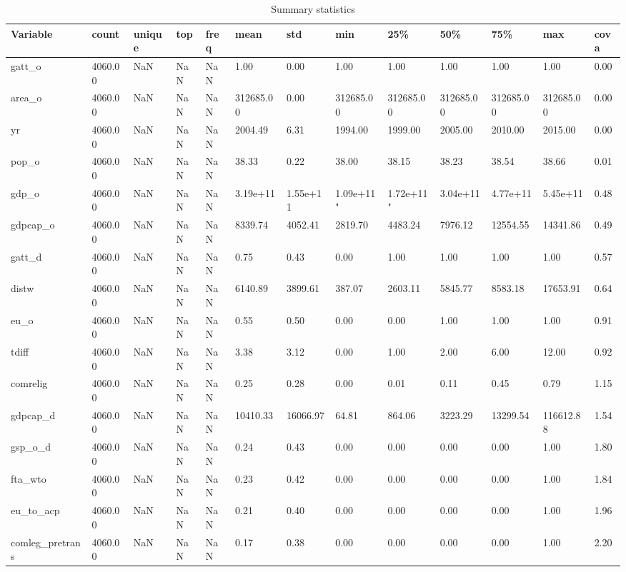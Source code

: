 \documentclass{Trade_template}
\numberwithin{equation}{section}
\begin{document}
\begin{table}
    \centering
    \caption[Summary statistics]{Summary statistics}
    \label{Stats}
\tiny{
\begin{tabularx}{\textwidth}{@{} L *{12}{Y}  @{}}
\toprule
Variable & count & unique & top & freq & mean & std & min & 25\% & 50\% & 75\% & max & cova  \\ \midrule
gatt\_o & 4060.00 & NaN & NaN & NaN & 1.00 & 0.00 & 1.00 & 1.00 & 1.00 & 1.00 & 1.00 & 0.00 \\
area\_o & 4060.00 & NaN & NaN & NaN & 312685.00 & 0.00 & 312685.00 & 312685.00 & 312685.00 & 312685.00 & 312685.00 & 0.00 \\
yr & 4060.00 & NaN & NaN & NaN & 2004.49 & 6.31 & 1994.00 & 1999.00 & 2005.00 & 2010.00 & 2015.00 & 0.00 \\
pop\_o & 4060.00 & NaN & NaN & NaN & 38.33 & 0.22 & 38.00 & 38.15 & 38.23 & 38.54 & 38.66 & 0.01 \\
gdp\_o & 4060.00 & NaN & NaN & NaN & 3.19e+11 & 1.55e+11 & 1.09e+11" & 1.72e+11" & 3.04e+11 & 4.77e+11 & 5.45e+11 & 0.48 \\
gdpcap\_o & 4060.00 & NaN & NaN & NaN & 8339.74 & 4052.41 & 2819.70 & 4483.24 & 7976.12 & 12554.55 & 14341.86 & 0.49 \\
gatt\_d & 4060.00 & NaN & NaN & NaN & 0.75 & 0.43 & 0.00 & 1.00 & 1.00 & 1.00 & 1.00 & 0.57 \\
distw & 4060.00 & NaN & NaN & NaN & 6140.89 & 3899.61 & 387.07 & 2603.11 & 5845.77 & 8583.18 & 17653.91 & 0.64 \\
eu\_o & 4060.00 & NaN & NaN & NaN & 0.55 & 0.50 & 0.00 & 0.00 & 1.00 & 1.00 & 1.00 & 0.91 \\
tdiff & 4060.00 & NaN & NaN & NaN & 3.38 & 3.12 & 0.00 & 1.00 & 2.00 & 6.00 & 12.00 & 0.92 \\
comrelig & 4060.00 & NaN & NaN & NaN & 0.25 & 0.28 & 0.00 & 0.01 & 0.11 & 0.45 & 0.79 & 1.15 \\
gdpcap\_d & 4060.00 & NaN & NaN & NaN & 10410.33 & 16066.97 & 64.81 & 864.06 & 3223.29 & 13299.54 & 116612.88 & 1.54 \\
gsp\_o\_d & 4060.00 & NaN & NaN & NaN & 0.24 & 0.43 & 0.00 & 0.00 & 0.00 & 0.00 & 1.00 & 1.80 \\
fta\_wto & 4060.00 & NaN & NaN & NaN & 0.23 & 0.42 & 0.00 & 0.00 & 0.00 & 0.00 & 1.00 & 1.84 \\
eu\_to\_acp & 4060.00 & NaN & NaN & NaN & 0.21 & 0.40 & 0.00 & 0.00 & 0.00 & 0.00 & 1.00 & 1.96 \\
comleg\_pretrans & 4060.00 & NaN & NaN & NaN & 0.17 & 0.38 & 0.00 & 0.00 & 0.00 & 0.00 & 1.00 & 2.20 \\

\end{tabularx}}
\end{table}
\end{document}
